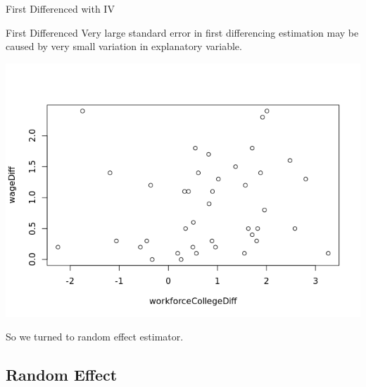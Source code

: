 \documentclass[compress]{beamer}
\begin{document}
\begin{frame}{First Differenced with IV}
\begin{table}[!htbp]
  \end{table} 
\end{frame}

\begin{frame}{First Differenced}
  Very large standard error in first differencing estimation may be caused by very small variation in explanatory variable.
  \begin{center}
    \includegraphics[height=0.5\textheight]{unnamed-chunk-24-1.png}
  \end{center}
  
  So we turned to random effect estimator.
\end{frame}

\subsection{Random Effect}
\end{document}
